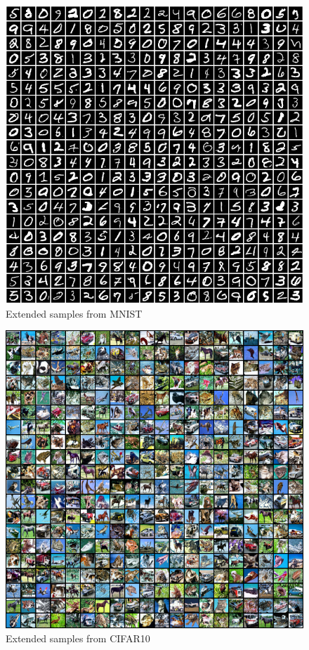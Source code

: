\documentclass{article}
\begin{document}
\begin{figure}[h!]
    \centering
    \includegraphics[width=\linewidth]{figures/samples/mnist_samples_large.png}
    \caption{Extended samples from MNIST}
    \label{fig:mnist-samples-large}
\end{figure}

\begin{figure}[h!]
    \centering
    \includegraphics[width=\linewidth]{figures/samples/refinenet128_cifar10_L10_step120000_20x20.png}
    \caption{Extended samples from CIFAR10}
    \label{fig:cifar10-samples-large}
\end{figure}
\end{document}
